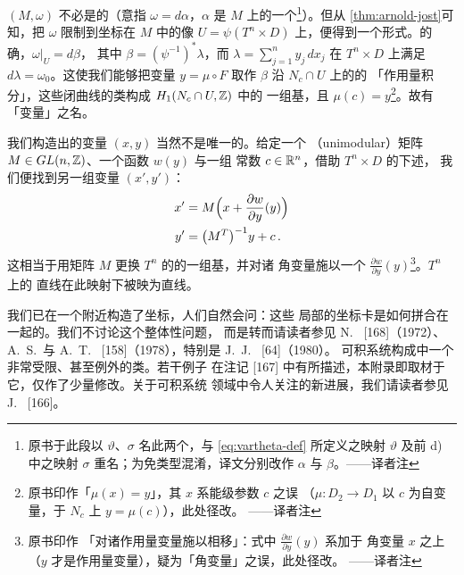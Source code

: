 \trSymplecticManifold{} $(M,\omega)$ 不必是\trExact{}的（\trExact{}意指%
$\omega=d\alpha$，$\alpha$ 是 $M$ 上的一个\trOneForm\footnote{原书于此段以%
$\vartheta$、$\sigma$ 名此两个\trOneForm，与 \eqref{eq:vartheta-def} 所定义之映射%
$\vartheta$ 及前 d) 中之映射 $\sigma$ 重名；为免类型混淆，译文分别改作 $\alpha$%
与 $\beta$。——译者注}）。但从%
\cref*{thm:arnold-jost}可知，把 $\omega$ 限制到\trActionAngle{}坐标在 $M$ 中的像%
$U=\psi(T^{n}\times D)$ 上，便得到一个\trExact{}形式。的确，$\omega\big|_{U}=d\beta$，%
其中\trOneForm{} $\beta=(\psi^{-1})^{*}\lambda$，而 $\lambda=\sum_{j=1}^{n}y_{j}\,dx_{j}$%
在 $T^{n}\times D$ 上满足 $d\lambda=\omega_{0}$。这使我们能够把\trAction{}变量%
$y=\mu\circ F$ 取作 $\beta$ 沿 $N_{c}\cap U$ 上的\trClosed\trCurve{}的%
「作用量积分」，这些闭曲线的\trHomology{}类构成 $H_{1}(N_{c}\cap U,\mathbb{Z})$ 中的%
一组基，且 $\mu(c)=y$\footnote{原书印作「$\mu(x)=y$」，其 $x$ 系能级参数 $c$ 之误%
（$\mu:D_{2}\to D_{1}$ 以 $c$ 为自变量，于 $N_{c}$ 上 $y=\mu(c)$），此处径改。%
——译者注}。故有「\trAction{}变量」之名。


我们构造出的\trActionAngle{}变量 $(x,y)$ 当然不是唯一的。给定一个%
\textbf{\trUnimodular}（unimodular）矩阵 $M\in GL(n,\mathbb{Z})$、一个函数 $w(y)$ 与一组%
常数 $c\in\mathbb{R}^{n}$，借助 $T^{n}\times D$ 的下述\trSymplecticDiffeomorphism，%
我们便找到另一组\trActionAngle{}变量 $(x',y')$：
\begin{align*}
x' &= M\Bigl(x+\frac{\partial w}{\partial y}(y)\Bigr)\\
y' &= \bigl(M^{T}\bigr)^{-1}y+c\,.
\end{align*}
这相当于用矩阵 $M$ 更换 $T^{n}$ 的\trFundamentalGroup{}的一组基，并对诸%
角变量施以一个\trPhaseShift{} $\frac{\partial w}{\partial y}(y)$\footnote{原书印作%
「对诸作用量变量施以相移」：式中 $\frac{\partial w}{\partial y}(y)$ 系加于%
角变量 $x$ 之上（$y$ 才是作用量变量），疑为「角变量」之误，此处径改。%
——译者注}。$T^{n}$ 上的%
直线在此映射下被映为直线。

我们已在一个\trTorus{}附近构造了\trActionAngle{}坐标，人们自然会问：这些%
局部的\trActionAngle{}坐标卡是如何拼合在一起的。我们不讨论这个整体性问题，%
而是转而请读者参见 N.~\trNekhoroshev{} [168]（1972）、A.~S.~\trMishchenko{}与%
A.~T.~\trFomenko{} [158]（1978），特别是 J.~J.~\trDuistermaat{} [64]（1980）。%
可积系统构成\trHamiltonianSystem{}中一个非常受限、甚至例外的类。若干例子%
在注记 [167] 中有所描述，本附录即取材于它，仅作了少量修改。关于可积系统%
领域中令人关注的新进展，我们请读者参见 J.~\trMoser{} [166]。
